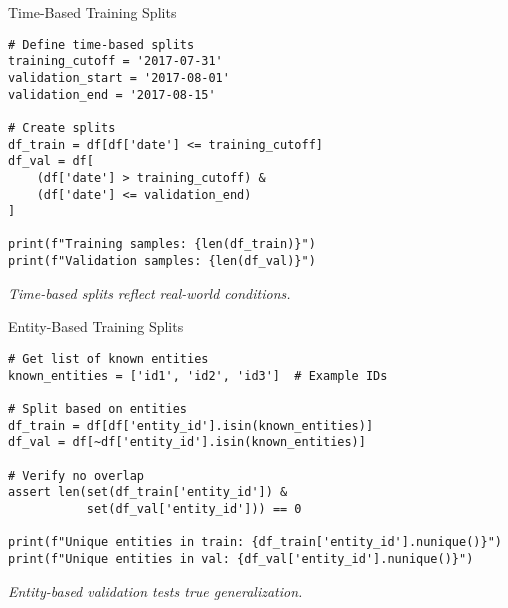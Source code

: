 \documentclass[aspectratio=169]{beamer}
\begin{document}

\begin{frame}[fragile]{Time-Based Training Splits}
\begin{verbatim}
# Define time-based splits
training_cutoff = '2017-07-31'
validation_start = '2017-08-01'
validation_end = '2017-08-15'

# Create splits
df_train = df[df['date'] <= training_cutoff]
df_val = df[
    (df['date'] > training_cutoff) &
    (df['date'] <= validation_end)
]

print(f"Training samples: {len(df_train)}")
print(f"Validation samples: {len(df_val)}")
\end{verbatim}

\emph{Time-based splits reflect real-world conditions.}
\end{frame}


\begin{frame}[fragile]{Entity-Based Training Splits}
\begin{verbatim}
# Get list of known entities
known_entities = ['id1', 'id2', 'id3']  # Example IDs

# Split based on entities
df_train = df[df['entity_id'].isin(known_entities)]
df_val = df[~df['entity_id'].isin(known_entities)]

# Verify no overlap
assert len(set(df_train['entity_id']) &
           set(df_val['entity_id'])) == 0

print(f"Unique entities in train: {df_train['entity_id'].nunique()}")
print(f"Unique entities in val: {df_val['entity_id'].nunique()}")
\end{verbatim}

\emph{Entity-based validation tests true generalization.}
\end{frame}
\end{document}
